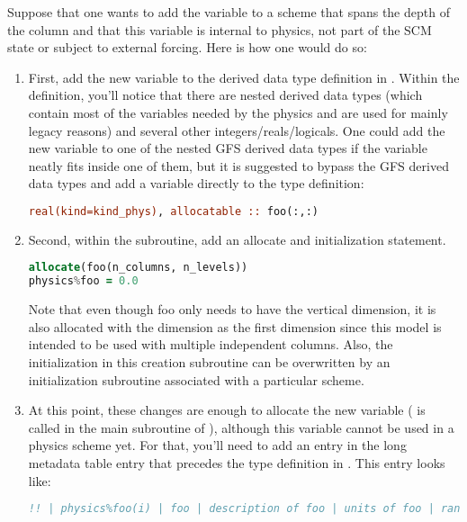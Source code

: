 Suppose that one wants to add the variable  to a scheme that spans the depth of the column and that this variable is internal to physics, not part of the SCM state or subject to external forcing. Here is how one would do so:

\begin{enumerate}
\item First, add the new variable to the  derived data type definition in . Within the definition, you'll notice that there are nested derived data types (which contain most of the variables needed by the physics and are used for mainly legacy reasons) and several other integers/reals/logicals. One could add the new variable to one of the nested GFS derived data types if the variable neatly fits inside one of them, but it is suggested to bypass the GFS derived data types and add a variable directly to the  type definition:
\begin{lstlisting}[language=Fortran]
real(kind=kind_phys), allocatable :: foo(:,:)
\end{lstlisting}

\item Second, within the  subroutine, add an allocate and initialization statement.
\begin{lstlisting}[language=Fortran]
allocate(foo(n_columns, n_levels))
physics%foo = 0.0
\end{lstlisting}
Note that even though foo only needs to have the vertical dimension, it is also allocated with the  dimension as the first dimension since this model is intended to be used with multiple independent columns. Also, the initialization in this creation subroutine can be overwritten by an initialization subroutine associated with a particular scheme.

\item At this point, these changes are enough to allocate the new variable ( is called in the main subroutine of ), although this variable cannot be used in a physics scheme yet. For that, you'll need to add an entry in the long metadata table entry that precedes the  type definition in . This entry looks like:

\begin{lstlisting}[language=Fortran]
!! | physics%foo(i) | foo | description of foo | units of foo | rank of foo | data type of foo| kind of data type (if real) | intent (none) | whether foo is optional (T or F) |
\end{lstlisting}


\end{enumerate}
